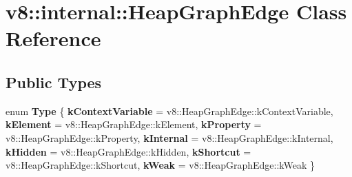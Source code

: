 \hypertarget{classv8_1_1internal_1_1HeapGraphEdge}{}\section{v8\+:\+:internal\+:\+:Heap\+Graph\+Edge Class Reference}
\label{classv8_1_1internal_1_1HeapGraphEdge}
\subsection*{Public Types}
\begin{DoxyCompactItemize}
\item 
\mbox{\label{classv8_1_1internal_1_1HeapGraphEdge_ac5999a0e6fcaad7e23822c0f205c40eb}} 
enum {\bfseries Type} \{ \newline
{\bfseries k\+Context\+Variable} = v8\+:\+:Heap\+Graph\+Edge\+:\+:k\+Context\+Variable, 
{\bfseries k\+Element} = v8\+:\+:Heap\+Graph\+Edge\+:\+:k\+Element, 
{\bfseries k\+Property} = v8\+:\+:Heap\+Graph\+Edge\+:\+:k\+Property, 
{\bfseries k\+Internal} = v8\+:\+:Heap\+Graph\+Edge\+:\+:k\+Internal, 
\newline
{\bfseries k\+Hidden} = v8\+:\+:Heap\+Graph\+Edge\+:\+:k\+Hidden, 
{\bfseries k\+Shortcut} = v8\+:\+:Heap\+Graph\+Edge\+:\+:k\+Shortcut, 
{\bfseries k\+Weak} = v8\+:\+:Heap\+Graph\+Edge\+:\+:k\+Weak
 \}
\end{DoxyCompactItemize}
